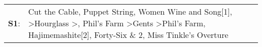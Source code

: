 \begin{supertabular}{p{0.03\textwidth}p{0.92\textwidth}}
 \textbf{S1}:  &  Cut the Cable\textsuperscript{}, \enspace Puppet String\textsuperscript{}, \enspace Women Wine and Song[1]\textsuperscript{}, \textsuperscript{} \textgreater \enspace Hourglass\textsuperscript{} \textgreater {}\textsuperscript{}, \enspace Phil's Farm\textsuperscript{} \textgreater \enspace Gents\textsuperscript{} \textgreater \enspace Phil's Farm\textsuperscript{}, \enspace Hajimemashite[2]\textsuperscript{}, \enspace Forty-Six \& 2\textsuperscript{}, \enspace Miss Tinkle's Overture\textsuperscript{}  \enspace  \\
\end{supertabular}
